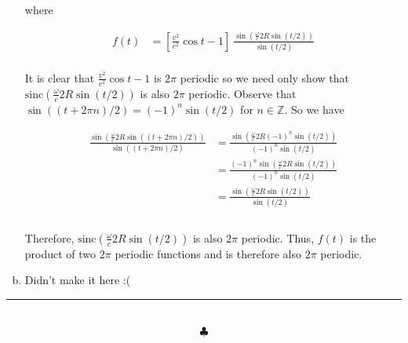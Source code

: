\documentclass[]{article}
\begin{document}
\begin{enumerate}[a)]
where


\begin{equation}
\begin{aligned}
f \left( t \right) &=  \left[ \frac{v^2}{c^2} \cos t - 1\right] \: \frac{ \sin(  \frac{\omega}{c} 2R \sin( t/2  )  )  }{   \sin( t/2  ) }
\end{aligned}
\end{equation} \\


It is clear that  $\frac{v^2}{c^2} \cos t - 1$ is $2\pi$ periodic so we need only show that $\text{sinc}(  \frac{\omega}{c} 2R \sin( t/2  ) )$ is also $2\pi$ periodic. Observe that $\sin( (t+2\pi n)/2  ) = (-1)^n\sin( t/2  ) $ for $n \in \mathbb{Z}$. So we have

\begin{equation}
\begin{aligned}
\frac{ \sin(  \frac{\omega}{c} 2R \sin( (t+2\pi n)/2   )  )  }{   \sin( (t+2\pi n)/2    ) } & = \frac{ \sin(  \frac{\omega}{c} 2R (-1)^n \sin( t/2   )  )  }{ (-1)^n  \sin( t/2    ) } \\
& = \frac{  (-1)^n \sin(  \frac{\omega}{c} 2R  \sin( t/2   )  )  }{ (-1)^n  \sin( t/2    ) } \\
%
& = \frac{  \sin(  \frac{\omega}{c} 2R  \sin( t/2   )  )  }{  \sin( t/2    ) } \\
\end{aligned}
\end{equation} \\

Therefore, $\text{sinc}(  \frac{\omega}{c} 2R \sin( t/2  ) )$ is also $2\pi$ periodic. Thus, $f(t)$ is the product of two $2\pi$ periodic functions and is therefore also $2\pi$ periodic. \\

\item Didn't make it here :(









\end{enumerate}










\newpage




 
\noindent\rule{15cm}{0.4pt} \\

$$\clubsuit$$
\end{document}
